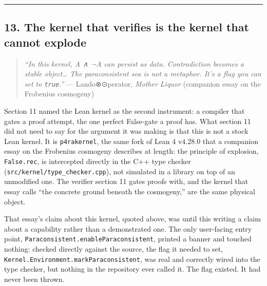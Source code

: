\documentclass[12pt,a4paper]{article}
\begin{document}
\begin{center}\rule{0.5\linewidth}{0.5pt}\end{center}

\hypertarget{the-kernel-that-verifies-is-the-kernel-that-cannot-explode}{%
\subsection{13. The kernel that verifies is the kernel that cannot
explode}\label{the-kernel-that-verifies-is-the-kernel-that-cannot-explode}}

\begin{quote}
\emph{``In this kernel, A ∧ ¬A can persist as data. Contradiction
becomes a stable object\ldots{} The paraconsistent sea is not a
metaphor. It's a flag you can set to \texttt{true}.''} ---
Lando⊗⊙perator, \emph{Mother Liquor} (companion essay on the Frobenius
cosmogeny)
\end{quote}

Section 11 named the Lean kernel as the second instrument: a compiler
that gates a proof attempt, the one perfect False-gate a proof has. What
section 11 did not need to say for the argument it was making is that
this is not a stock Lean kernel. It is \texttt{p4rakernel}, the same
fork of Lean 4 v4.28.0 that a companion essay on the Frobenius cosmogeny
describes at length: the principle of explosion, \texttt{False.rec}, is
intercepted directly in the C++ type checker
(\texttt{src/kernel/type\_checker.cpp}), not simulated in a library on
top of an unmodified one. The verifier section 11 gates proofs with, and
the kernel that essay calls ``the concrete ground beneath the
cosmogeny,'' are the same physical object.

That essay's claim about this kernel, quoted above, was until this
writing a claim about a capability rather than a demonstrated one. The
only user-facing entry point,
\texttt{Paraconsistent.enableParaconsistent}, printed a banner and
touched nothing: checked directly against the source, the flag it needed
to set, \texttt{Kernel.Environment.markParaconsistent}, was real and
correctly wired into the type checker, but nothing in the repository
ever called it. The flag existed. It had never been thrown.
\end{document}
